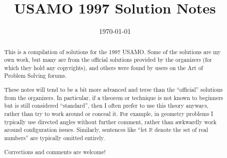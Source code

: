 \documentclass[11pt]{scrartcl}
\title{USAMO 1997 Solution Notes}
\date{\today}
\begin{document}
\maketitle

\begin{abstract}
This is a compilation of solutions
for the 1997 USAMO.
Some of the solutions are my own work,
but many are from the official solutions provided by the organizers
(for which they hold any copyrights),
and others were found by users on the Art of Problem Solving forums.

These notes will tend to be a bit more advanced and terse than the ``official''
solutions from the organizers.
In particular, if a theorem or technique is not known to beginners
but is still considered ``standard'', then I often prefer to
use this theory anyways, rather than try to work around or conceal it.
For example, in geometry problems I typically use directed angles
without further comment, rather than awkwardly work around configuration issues.
Similarly, sentences like ``let $\mathbb{R}$ denote the set of real numbers''
are typically omitted entirely.

Corrections and comments are welcome!
\end{abstract}

\tableofcontents
\newpage

\addtocounter{section}{-1}
\end{document}
